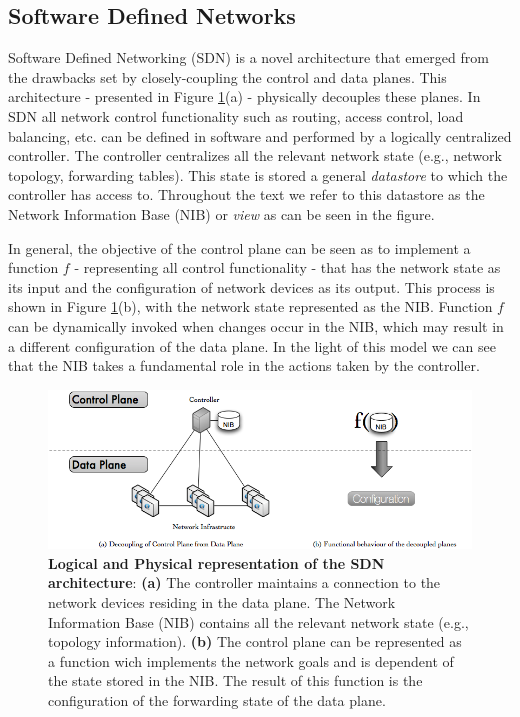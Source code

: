 \subsection{Software Defined Networks} 
 Software Defined Networking (SDN) is a novel architecture that emerged from the drawbacks set by closely-coupling the control and data planes. This architecture - presented in  Figure \ref{fig:sdn.2d}(a) - physically decouples these planes. In SDN all network control functionality  such as routing, access control, load balancing, etc. can be defined in software and performed by a logically centralized controller. The controller centralizes all the relevant network state (e.g., network topology, forwarding tables). This state is stored a general \emph{datastore} to which the controller has access to. Throughout the text we refer to this datastore as the Network Information Base (NIB) or \emph{view} as can be seen in the figure. 

In general, the objective of the control plane can be seen as to
implement a function $f$ - representing all control functionality -
that has the network state as its input and the configuration of
network devices as its output. This process is shown in Figure
\ref{fig:sdn.2d}(b), with the network state represented as the
NIB. Function $f$ can be dynamically invoked when changes occur in the
NIB, which may result in a different configuration of the data
plane. In the light of this model we can see that the NIB takes a
fundamental role in the actions taken by the controller. 


\begin{figure}
  \centering 
  \footnotesize
  \includegraphics[scale=0.5]{pic/sdn-2d.png}
  \caption[Logical and Physical representation of the SDN architecture]{\textbf{Logical and Physical representation of the SDN architecture}: \textbf{(a)} The controller maintains a connection to the network devices residing in the data plane. The Network Information Base (NIB) contains all the relevant network state (e.g., topology information). \textbf{(b)} The control plane can be represented as a function wich implements the network goals and is dependent of the state stored in the NIB. The result of this function is the configuration of the forwarding state of the data plane.}
  \label{fig:sdn.2d}
\end{figure}

